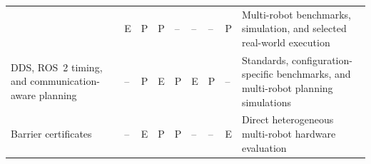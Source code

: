 \begin{table}[!h]
\begin{tabularx}{\textwidth}{@{}P{0.21\textwidth}*{7}{>{\centering\arraybackslash}P{0.047\textwidth}}Y@{}}
      & E & P & P & -- & -- & -- & P & Multi-robot benchmarks, simulation, and selected real-world execution \\
    DDS, ROS~2 timing, and communication-aware planning \cite{omg2015dds,gielis2022communications,kronauer2021latency,silva2026probabilistic}
      & -- & P & E & P & E & P & -- & Standards, configuration-specific benchmarks, and multi-robot planning simulations \\
    Barrier certificates \cite{wang2017barrier}
      & -- & E & P & P & -- & -- & E & Direct heterogeneous multi-robot hardware evaluation \\
    \bottomrule
  \end{tabularx}
\end{table}
